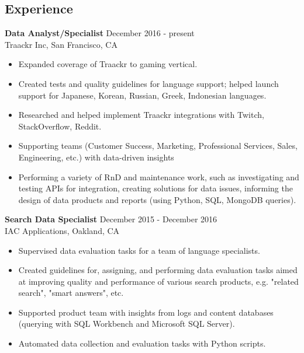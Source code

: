 \documentclass[line]{res}
\begin{document}
\address{mulenoksv@gmail.com or (415)-359-3454}

\begin{resume}
\pagestyle{empty}
\section{Experience}
    \textbf{Data Analyst/Specialist} \hfill December 2016 - present\\
    Traackr Inc, San Francisco, CA
    \begin{itemize} \itemsep -2pt
    \item Expanded coverage of Traackr to gaming vertical.
    \item Created tests and quality guidelines for language support; helped launch support for Japanese, Korean, Russian, Greek, Indonesian languages.
    \item Researched and helped implement Traackr integrations with Twitch, StackOverflow, Reddit.
    \item Supporting teams (Customer Success, Marketing, Professional Services, Sales, Engineering, etc.) with data-driven insights
    \item Performing a variety of RnD and maintenance work, such as investigating and testing APIs for integration, creating solutions for data issues, informing the design of data products and reports (using Python, SQL, MongoDB queries).
    \end{itemize}

    \textbf{Search Data Specialist} \hfill December 2015 - December 2016 \\
    IAC Applications, Oakland, CA
    \begin{itemize} \itemsep -2pt
    \item Supervised data evaluation tasks for a team of language specialists.
    \item Created guidelines for, assigning, and performing data evaluation tasks aimed at improving quality and performance of various search products, e.g. "related search", "smart answers", etc.
    \item Supported product team with insights from logs and content databases (querying with SQL Workbench and Microsoft SQL Server).
    \item Automated data collection and evaluation tasks with Python scripts.
    \end{itemize}
    

\end{resume}
\end{document}
